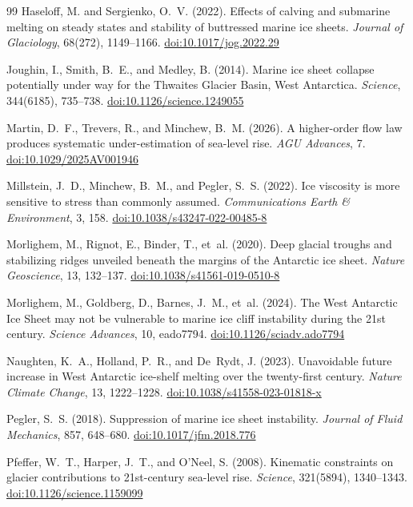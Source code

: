 \documentclass[11pt]{article}
\newcommand{\doi}[1]{\href{https://doi.org/#1}{doi:#1}}
\begin{document}
\begin{thebibliography}{99}
Haseloff, M. and Sergienko, O.~V. (2022).
Effects of calving and submarine melting on steady states and stability of buttressed marine ice sheets.
\textit{Journal of Glaciology}, 68(272), 1149--1166.
\doi{10.1017/jog.2022.29}

Joughin, I., Smith, B.~E., and Medley, B. (2014).
Marine ice sheet collapse potentially under way for the {T}hwaites {G}lacier {B}asin, {W}est {A}ntarctica.
\textit{Science}, 344(6185), 735--738.
\doi{10.1126/science.1249055}

Martin, D.~F., Trevers, R., and Minchew, B.~M. (2026).
A higher-order flow law produces systematic under-estimation of sea-level rise.
\textit{AGU Advances}, 7.
\doi{10.1029/2025AV001946}

Millstein, J.~D., Minchew, B.~M., and Pegler, S.~S. (2022).
Ice viscosity is more sensitive to stress than commonly assumed.
\textit{Communications Earth \& Environment}, 3, 158.
\doi{10.1038/s43247-022-00485-8}

Morlighem, M., Rignot, E., Binder, T., et~al. (2020).
Deep glacial troughs and stabilizing ridges unveiled beneath the margins of the {A}ntarctic ice sheet.
\textit{Nature Geoscience}, 13, 132--137.
\doi{10.1038/s41561-019-0510-8}

Morlighem, M., Goldberg, D., Barnes, J.~M., et~al. (2024).
The {W}est {A}ntarctic {I}ce {S}heet may not be vulnerable to marine ice cliff instability during the 21st century.
\textit{Science Advances}, 10, eado7794.
\doi{10.1126/sciadv.ado7794}

Naughten, K.~A., Holland, P.~R., and De~Rydt, J. (2023).
Unavoidable future increase in {W}est {A}ntarctic ice-shelf melting over the twenty-first century.
\textit{Nature Climate Change}, 13, 1222--1228.
\doi{10.1038/s41558-023-01818-x}

Pegler, S.~S. (2018).
Suppression of marine ice sheet instability.
\textit{Journal of Fluid Mechanics}, 857, 648--680.
\doi{10.1017/jfm.2018.776}

Pfeffer, W.~T., Harper, J.~T., and O'Neel, S. (2008).
Kinematic constraints on glacier contributions to 21st-century sea-level rise.
\textit{Science}, 321(5894), 1340--1343.
\doi{10.1126/science.1159099}


\end{thebibliography}
\end{document}

